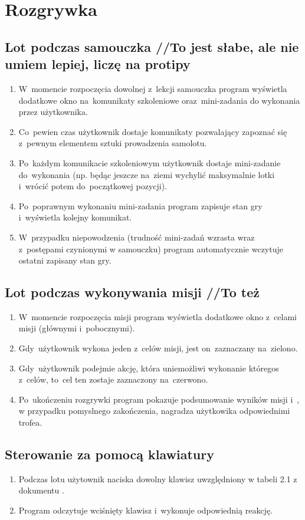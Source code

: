 \documentclass{mwrep}
\begin{document}
\chapter{Rozgrywka}
\section{Lot podczas samouczka //To jest słabe, ale nie umiem lepiej, liczę na protipy}
\begin{enumerate}
  \item W~momencie rozpoczęcia dowolnej z~lekcji samouczka program wyświetla dodatkowe okno na~komunikaty szkoleniowe oraz~mini-zadania do wykonania przez użytkownika.
  \item Co~pewien czas użytkownik dostaje komunikaty pozwalający zapoznać się z~pewnym elementem sztuki prowadzenia samolotu.
  \item Po~każdym komunikacie szkoleniowym użytkownik dostaje mini-zadanie do~wykonania (np. będąc jeszcze na~ziemi wychylić maksymalnie lotki i~wrócić potem do~początkowej pozycji).
  \item Po~poprawnym wykonaniu mini-zadania program zapisuje stan gry i~wyświetla kolejny komunikat.
  \item W~przypadku niepowodzenia (trudność mini-zadań wzrasta wraz z~postępami czynionymi w samouczku) program automatycznie wczytuje ostatni zapisany stan gry.
\end{enumerate}

\section{Lot podczas wykonywania misji //To też}
\begin{enumerate}
  \item W~momencie rozpoczęcia misji program wyświetla dodatkowe okno z~celami misji (głównymi i~pobocznymi).
  \item Gdy~użytkownik wykona jeden z~celów misji, jest on~zaznaczany na~zielono.
  \item Gdy~użytkownik podejmie akcję, która uniemożliwi wykonanie któregos z~celów, to~cel ten zostaje zaznaczony na~czerwono.
  \item Po~ukończeniu rozgrywki program pokazuje podsumowanie wyników misji i~, w przypadku pomyslnego zakończenia, nagradza użytkowika odpowiednimi trofea.
\end{enumerate}

\section{Sterowanie za pomocą klawiatury}
\begin{enumerate}
  \item Podczas lotu użytownik naciska dowolny klawisz uwzględniony w tabeli 2.1 z dokumentu \cite{WYM}.
  \item Program odczytuje wciśnięty klawisz i~wykonuje odpowiednią reakcję.
\end{enumerate}
\end{document}
